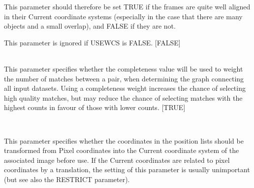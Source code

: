 \documentclass[twoside,11pt]{article}
\renewcommand{\_}{\texttt{\symbol{95}}}
\newcommand{\sstsubsection}[1]{ \item[{#1}] \mbox{} \\}
\newcommand{\sstsubsection}[1]{\item[{#1}]}
\begin{document}
{{{         This parameter should therefore be set TRUE if the frames
         are quite well aligned in their Current coordinate systems
         (especially in the case that there are many objects and a
         small overlap), and FALSE if they are not.

         This parameter is ignored if USEWCS is FALSE.
         [FALSE]
      }
      \sstsubsection{
         USECOM = LOGICAL (Read)
      } {
         This parameter specifies whether the completeness value will
         be used to weight the number of matches between a pair, when
         determining the graph connecting all input datasets. Using
         a completeness weight increases the chance of selecting high
         quality matches, but may reduce the chance of selecting matches
         with the highest counts in favour of those with lower counts.
         [TRUE]
      }
      \sstsubsection{
         USEWCS = LOGICAL (Read)
      } {
         This parameter specifies whether the coordinates in the
         position lists should be transformed from Pixel coordinates
         into the Current coordinate system of the associated image
         before use.
         If the Current coordinates are related to pixel coordinates
         by a translation, the setting of this parameter is usually
         unimportant (but see also the RESTRICT parameter).

}}}
\end{document}
